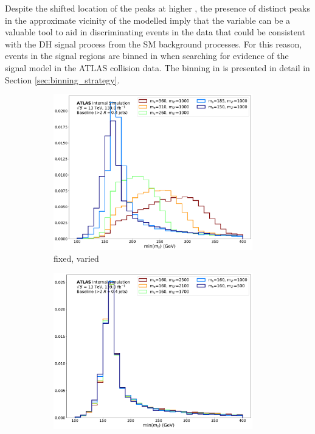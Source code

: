 Despite the shifted location of the peaks at higher \ms, the presence of distinct peaks in the approximate vicinity of the modelled \ms imply that the \minms variable can be a valuable tool to aid in discriminating events in the data that could be consistent with the DH signal process from the SM background processes. For this reason, events in the signal regions are binned in \ms when searching for evidence of the signal model in the ATLAS collision data. The binning in \minms is presented in detail in Section \ref{sec:binning_strategy}.

\begin{figure}[H]
	\centering
	\begin{subfigure}[b]{0.49\textwidth}
	\includegraphics[width=0.95\textwidth]{Figures/5/TARJets10_minmS_res_ms.pdf}
	\caption{\mZp fixed, \ms varied}
	\label{fig:minms_res_ms}
	\end{subfigure}
	\begin{subfigure}[b]{0.49\textwidth}
	\includegraphics[width=0.95\textwidth]{Figures/5/TARJets10_minmS_res_mZp.pdf}

\end{subfigure}
\end{figure}
